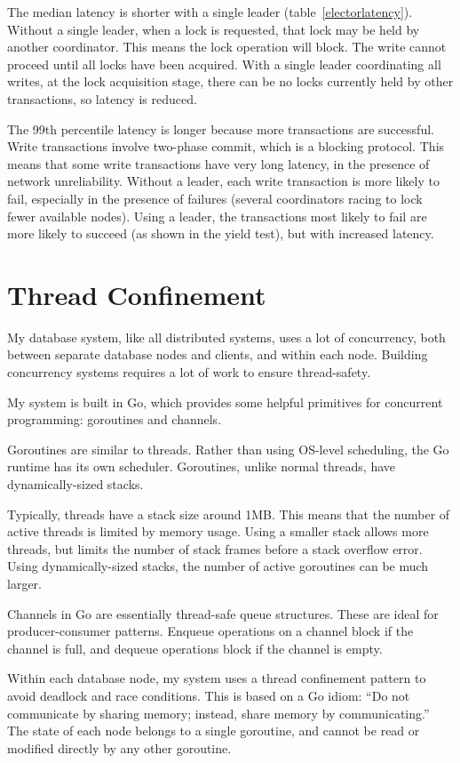 \documentclass[12pt,a4paper,twoside,openany]{report}
\begin{document}
The median latency is shorter with a single leader (table~\ref{electorlatency}). Without a single leader, when a lock is requested, that lock may be held by another coordinator. This means the lock operation will block. The write cannot proceed until all locks have been acquired. With a single leader coordinating all writes, at the lock acquisition stage, there can be no locks currently held by other transactions, so latency is reduced.

The 99th percentile latency is longer because more transactions are successful. Write transactions involve two-phase commit, which is a blocking protocol. This means that some write transactions have very long latency, in the presence of network unreliability. Without a leader, each write transaction is more likely to fail, especially in the presence of failures (several coordinators racing to lock fewer available nodes). Using a leader, the transactions most likely to fail are more likely to succeed (as shown in the yield test), but with increased latency. 
\section{Thread Confinement}

My database system, like all distributed systems, uses a lot of concurrency, both between separate database nodes and clients, and within each node. Building concurrency systems requires a lot of work to ensure thread-safety.

My system is built in Go, which provides some helpful primitives for concurrent programming: goroutines and channels.

Goroutines are similar to threads. Rather than using OS-level scheduling, the Go runtime has its own scheduler. Goroutines, unlike normal threads, have dynamically-sized stacks.

Typically, threads have a stack size around 1MB. This means that the number of active threads is limited by memory usage. Using a smaller stack allows more threads, but limits the number of stack frames before a stack overflow error. Using dynamically-sized stacks, the number of active goroutines can be much larger.

Channels in Go are essentially thread-safe queue structures. These are ideal for producer-consumer patterns. Enqueue operations on a channel block if the channel is full, and dequeue operations block if the channel is empty.

Within each database node, my system uses a thread confinement pattern to avoid deadlock and race conditions. This is based on a Go idiom: ``Do not communicate by sharing memory; instead, share memory by communicating.'' \cite{effective} The state of each node belongs to a single goroutine, and cannot be read or modified directly by any other goroutine.
\end{document}
